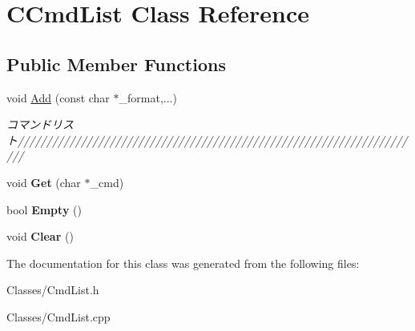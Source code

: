 \hypertarget{class_c_cmd_list}{}\section{C\+Cmd\+List Class Reference}
\label{class_c_cmd_list}
\subsection*{Public Member Functions}
\begin{DoxyCompactItemize}
\item 
void \hyperlink{class_c_cmd_list_a718e9fc133794256cc2815785a5ef20c}{Add} (const char $\ast$\+\_\+format,...)\hypertarget{class_c_cmd_list_a718e9fc133794256cc2815785a5ef20c}{}\label{class_c_cmd_list_a718e9fc133794256cc2815785a5ef20c}

\begin{DoxyCompactList}\small\item\em コマンドリスト/////////////////////////////////////////////////////////////////////// \end{DoxyCompactList}\item 
void {\bfseries Get} (char $\ast$\+\_\+cmd)\hypertarget{class_c_cmd_list_ae8125e1b77031faba6ad5dbf0dc465fc}{}\label{class_c_cmd_list_ae8125e1b77031faba6ad5dbf0dc465fc}

\item 
bool {\bfseries Empty} ()\hypertarget{class_c_cmd_list_a0d76c9c53f438f2df885c3f1d6e98ce0}{}\label{class_c_cmd_list_a0d76c9c53f438f2df885c3f1d6e98ce0}

\item 
void {\bfseries Clear} ()\hypertarget{class_c_cmd_list_ae2561b482fd1e96950398a4585291746}{}\label{class_c_cmd_list_ae2561b482fd1e96950398a4585291746}

\end{DoxyCompactItemize}


The documentation for this class was generated from the following files\+:\begin{DoxyCompactItemize}
\item 
Classes/Cmd\+List.\+h\item 
Classes/Cmd\+List.\+cpp\end{DoxyCompactItemize}
